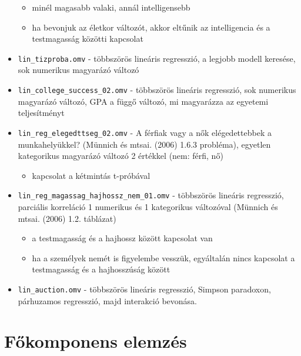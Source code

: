 \documentclass[
  letterpaper,
]{krantz}
\providecommand{\tightlist}{%
  \setlength{\itemsep}{0pt}\setlength{\parskip}{0pt}}\usepackage{longtable,booktabs,array}
\begin{document}
\begin{itemize}
  \begin{itemize}
  \tightlist
  \item
    minél magasabb valaki, annál intelligensebb
  \item
    ha bevonjuk az életkor változót, akkor eltűnik az intelligencia és a
    testmagasság közötti kapcsolat
  \end{itemize}
\item
  \texttt{lin\_tizproba.omv} - többszörös lineáris regresszió, a legjobb
  modell keresése, sok numerikus magyarázó változó
\item
  \texttt{lin\_college\_success\_02.omv} - többszörös lineáris
  regresszió, sok numerikus magyarázó változó, GPA a függő változó, mi
  magyarázza az egyetemi teljesítményt
\item
  \texttt{lin\_reg\_elegedttseg\_02.omv} - A férfiak vagy a nők
  elégedettebbek a munkahelyükkel? (Münnich és mtsai. (2006) 1.6.3
  probléma), egyetlen kategorikus magyarázó változó 2 értékkel (nem:
  férfi, nő)

  \begin{itemize}
  \tightlist
  \item
    kapcsolat a kétmintás t-próbával
  \end{itemize}
\item
  \texttt{lin\_reg\_magassag\_hajhossz\_nem\_01.omv} - többszörös
  lineáris regresszió, parciális korreláció 1 numerikus és 1 kategorikus
  változóval (Münnich és mtsai. (2006) 1.2. táblázat)

  \begin{itemize}
  \tightlist
  \item
    a testmagasság és a hajhossz között kapcsolat van
  \item
    ha a személyek nemét is figyelembe vesszük, egyáltalán nincs
    kapcsolat a testmagasság és a hajhosszúság között
  \end{itemize}
\item
  \texttt{lin\_auction.omv} - többszörös lineáris regresszió, Simpson
  paradoxon, párhuzamos regresszió, majd interakció bevonása.
\end{itemize}

\hypertarget{fux151komponens-elemzuxe9s}{%
\section{Főkomponens elemzés}\label{fux151komponens-elemzuxe9s}}
\end{document}
